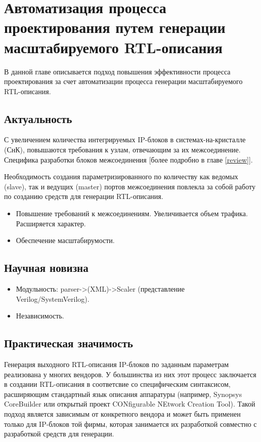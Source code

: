 
\chapter{Автоматизация процесса проектирования путем генерации масштабируемого RTL-описания} \label{generation}

В данной главе описывается подход повышения эффективности процесса проектирования за счет автоматизации процесса генерации масштабируемого RTL-описания.

\section{Актуальность}

С увеличением количества интегрируемых IP-блоков в системах-на-кристалле (СнК), повышаются требования к узлам, отвечающим за их межсоединение.
Специфика разработки блоков межсоединения [более подробно в главе \ref{review}].

Необходимость создания параметризированного по количеству как ведомых (slave), так и ведущих (master) портов межсоединения повлекла за собой работу по созданию средств для генерации RTL-описания.

\begin{itemize}
  \item Повышение требований к межсоединениям.
    \subitem Увеличивается объем трафика.
    \subitem Расширяется характер.
  \item Обеспечение масштабирумости.
\end{itemize}

\section{Научная новизна}

\begin{itemize}
  \item Модульность: parser->(XML)->Scaler (представление Verilog/SystemVerilog).
  \item Независимость.
\end{itemize}

\section{Практическая значимость}

Генерация выходного RTL-описания IP-блоков по заданным параметрам реализована у многих вендоров. У большинства из них этот процесс заключается в создании RTL-описания в соответсвие со специфическим синтаксисом, расширяющим стандартный язык описания аппаратуры (например, Synopsys CoreBuilder или открытый проект CONfigurable NEtwork Creation Tool). Такой подход является зависимым от конкретного вендора и может быть применен только для IP-блоков той фирмы, которая занимается их разработкой совместно с разработкой средств для генерации.


